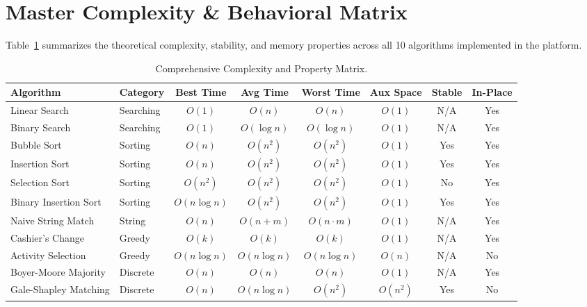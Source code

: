 \documentclass[11pt,a4paper]{article}
\theoremstyle{definition}
\theoremstyle{plain}
\theoremstyle{remark}
\begin{document}
\section{Master Complexity \& Behavioral Matrix}

Table~\ref{tab:master_complexity} summarizes the theoretical complexity, stability, and memory properties across all 10 algorithms implemented in the platform.

\begin{table}[htbp]
\centering
\small
\caption{Comprehensive Complexity and Property Matrix.}
\label{tab:master_complexity}
\begin{tabularx}{\textwidth}{l l c c c c c c}
\toprule
\textbf{Algorithm} & \textbf{Category} & \textbf{Best Time} & \textbf{Avg Time} & \textbf{Worst Time} & \textbf{Aux Space} & \textbf{Stable} & \textbf{In-Place} \\
\midrule
Linear Search & Searching & $O(1)$ & $O(n)$ & $O(n)$ & $O(1)$ & N/A & Yes \\
Binary Search & Searching & $O(1)$ & $O(\log n)$ & $O(\log n)$ & $O(1)$ & N/A & Yes \\
Bubble Sort & Sorting & $O(n)$ & $O(n^2)$ & $O(n^2)$ & $O(1)$ & Yes & Yes \\
Insertion Sort & Sorting & $O(n)$ & $O(n^2)$ & $O(n^2)$ & $O(1)$ & Yes & Yes \\
Selection Sort & Sorting & $O(n^2)$ & $O(n^2)$ & $O(n^2)$ & $O(1)$ & No & Yes \\
Binary Insertion Sort & Sorting & $O(n \log n)$ & $O(n^2)$ & $O(n^2)$ & $O(1)$ & Yes & Yes \\
Naive String Match & String & $O(n)$ & $O(n+m)$ & $O(n \cdot m)$ & $O(1)$ & N/A & Yes \\
Cashier's Change & Greedy & $O(k)$ & $O(k)$ & $O(k)$ & $O(1)$ & N/A & Yes \\
Activity Selection & Greedy & $O(n \log n)$ & $O(n \log n)$ & $O(n \log n)$ & $O(n)$ & N/A & No \\
Boyer-Moore Majority & Discrete & $O(n)$ & $O(n)$ & $O(n)$ & $O(1)$ & N/A & Yes \\
Gale-Shapley Matching & Discrete & $O(n)$ & $O(n \log n)$ & $O(n^2)$ & $O(n^2)$ & Yes & No \\
\bottomrule
\end{tabularx}
\end{table}

\end{document}
